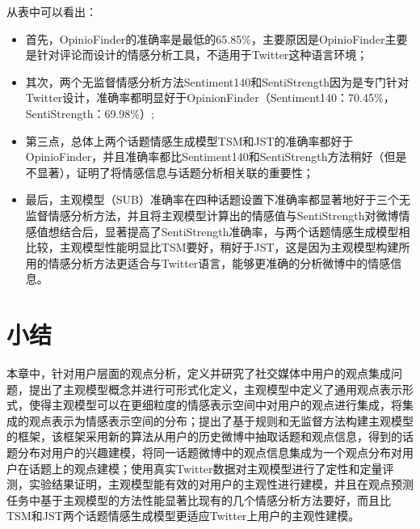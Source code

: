 从表中可以看出：
\begin{itemize}
\item 首先，OpinioFinder的准确率是最低的65.85\%，主要原因是OpinioFinder主要是针对评论而设计的情感分析工具，不适用于Twitter这种语言环境；
\item 其次，两个无监督情感分析方法Sentiment140和SentiStrength因为是专门针对Twitter设计，准确率都明显好于OpinionFinder（Sentiment140：70.45\%，SentiStrength：69.98\%）;
\item 第三点，总体上两个话题情感生成模型TSM和JST的准确率都好于OpinioFinder，并且准确率都比Sentiment140和SentiStrength方法稍好（但是不显著），证明了将情感信息与话题分析相关联的重要性；
\item 最后，主观模型（SUB）准确率在四种话题设置下准确率都显著地好于三个无监督情感分析方法，并且将主观模型计算出的情感值与SentiStrength对微博情感值想结合后，显著提高了SentiStrength准确率，与两个话题情感生成模型相比较，主观模型性能明显比TSM要好，稍好于JST，这是因为主观模型构建所用的情感分析方法更适合与Twitter语言，能够更准确的分析微博中的情感信息。
\end{itemize}

\section{小结}
\label{sec6}
本章中，针对用户层面的观点分析，定义并研究了社交媒体中用户的观点集成问题，提出了主观模型概念并进行可形式化定义，主观模型中定义了通用观点表示形式，使得主观模型可以在更细粒度的情感表示空间中对用户的观点进行集成，将集成的观点表示为情感表示空间的分布；提出了基于规则和无监督方法构建主观模型的框架，该框架采用新的算法从用户的历史微博中抽取话题和观点信息，得到的话题分布对用户的兴趣建模，将同一话题微博中的观点信息集成为一个观点分布对用户在话题上的观点建模；使用真实Twitter数据对主观模型进行了定性和定量评测，实验结果证明，主观模型能有效的对用户的主观性进行建模，并且在观点预测任务中基于主观模型的方法性能显著比现有的几个情感分析方法要好，而且比TSM和JST两个话题情感生成模型更适应Twitter上用户的主观性建模。
\newpage 
\mbox{} 
\newpage